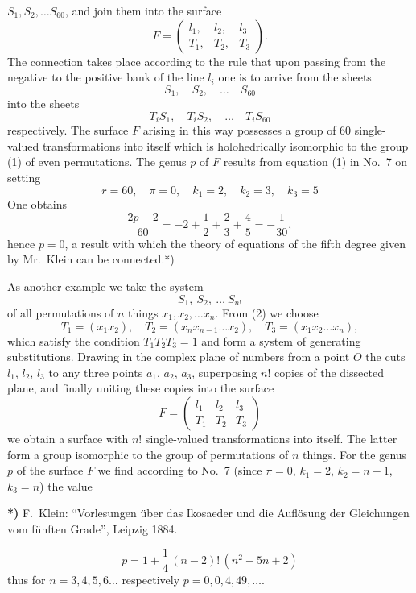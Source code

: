 \documentclass{article}
\begin{document}
$S_1, S_2, \dots S_{60}$, and join them into the surface
\[
F = \begin{pmatrix} l_1, & l_2, & l_3 \\ T_1, & T_2, & T_3 \end{pmatrix}.
\]
The connection takes place according to the rule that upon passing from the negative to the positive bank of the line $l_i$ one is to arrive from the sheets
\[
S_1, \quad S_2, \quad \dots \quad S_{60}
\]
into the sheets
\[
T_i S_1, \quad T_i S_2, \quad \dots \quad T_i S_{60}
\]
respectively. The surface $F$ arising in this way possesses a group of 60 single-valued transformations into itself which is holohedrically isomorphic to the group (1) of even permutations. The genus $p$ of $F$ results from equation (1) in No.~7 on setting
\[
r = 60, \quad \pi = 0, \quad k_1 = 2, \quad k_2 = 3, \quad k_3 = 5
\]
One obtains
\[
\frac{2p - 2}{60} = - 2 + \frac{1}{2} + \frac{2}{3} + \frac{4}{5} = - \frac{1}{30},
\]
hence $p = 0$, a result with which the theory of equations of the fifth degree given by Mr.~Klein can be connected.*)

As another example we take the system
\[
S_1, \ S_2, \ \dots \ S_{n!}
\tag{2}
\]
of all permutations of $n$ things $x_1, x_2, \dots x_n$. From (2) we choose
\[
T_1 = (x_1 x_2), \quad T_2 = (x_n x_{n-1} \dots x_2), \quad T_3 = (x_1 x_2 \dots x_n),
\]
which satisfy the condition $T_1 T_2 T_3 = 1$ and form a system of generating substitutions. Drawing in the complex plane of numbers from a point $O$ the cuts $l_1$, $l_2$, $l_3$ to any three points $a_1$, $a_2$, $a_3$, superposing $n!$ copies of the dissected plane, and finally uniting these copies into the surface
\[
F = \begin{pmatrix} l_1 & l_2 & l_3 \\ T_1 & T_2 & T_3 \end{pmatrix}
\]
we obtain a surface with $n!$ single-valued transformations into itself. The latter form a group isomorphic to the group of permutations of $n$ things. For the genus $p$ of the surface $F$ we find according to No.~7 (since $\pi = 0$, $k_1 = 2$, $k_2 = n - 1$, $k_3 = n$) the value

\textbf{*)} F.~Klein: ``Vorlesungen über das Ikosaeder und die Auflösung der Gleichungen vom fünften Grade'', Leipzig 1884.

\[
p = 1 + \frac{1}{4}\,(n - 2)!\,(n^2 - 5n + 2)
\tag{3}
\]
thus for $n = 3, 4, 5, 6 \dots$ respectively $p = 0, 0, 4, 49, \dots$.
\end{document}

